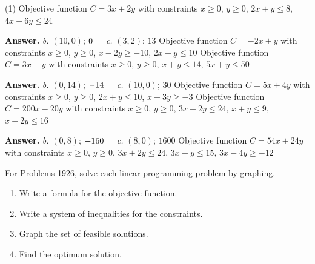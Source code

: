 \documentclass[10pt,]{book}
\theoremstyle{plain}
\theoremstyle{definition}
\theoremstyle{definition}
\theoremstyle{definition}
\numberwithin{equation}{part}
\begin{document}
\begin{exercisegroup}(1)
\exercise[13.]\hypertarget{exercise-17}{}Objective function \(C = 3x + 2y\) with constraints \(x\ge 0\), \(y\ge 0\), \(2x + y\le 8\), \(4x + 6y \le 24\)%
\par\smallskip
\noindent\textbf{Answer.}\hypertarget{answer-11}{}\quad
\emph{b.} \((10,0) \); \(0\hphantom{000}\)\emph{c.} \((3,2) \); \(13\)%
\exercise[14.]\hypertarget{exercise-18}{}Objective function \(C = −2x + y\) with constraints \(x\ge 0\), \(y\ge 0\), \(x-2y \ge -10\), \(2x+y\le 10\)%
\exercise[15.]\hypertarget{exercise-19}{}Objective function \(C = 3x − y\) with constraints \(x\ge 0\), \(y\ge 0\), \(x + y\le 14\), \(5x + y \le 50\)%
\par\smallskip
\noindent\textbf{Answer.}\hypertarget{answer-12}{}\quad
\emph{b.} \((0,14) \); \(-14\hphantom{000}\)\emph{c.} \((10,0) \); \(30\)%
\exercise[16.]\hypertarget{exercise-20}{}Objective function \(C = 5x + 4y\) with constraints \(x\ge 0\), \(y\ge 0\), \(2x+y \le 10\), \(x-3y\ge -3\)%
\exercise[17.]\hypertarget{exercise-21}{}Objective function \(C = 200x − 20y\) with constraints \(x\ge 0\), \(y\ge 0\), \(3x + 2y\le 24\), \(x + y \le 9\), \(x + 2y \le 16\)%
\par\smallskip
\noindent\textbf{Answer.}\hypertarget{answer-13}{}\quad
\emph{b.} \((0,8) \); \(-160\hphantom{000}\)\emph{c.} \((8,0) \); \(1600\)%
\exercise[18.]\hypertarget{exercise-22}{}Objective function \(C = 54x + 24y\) with constraints \(x\ge 0\), \(y\ge 0\), \(3x + 2y \le 24\), \(3x-y\le 15\), \(3x − 4y \ge −12\)%
\end{exercisegroup}
\par\smallskip\noindent
\hypertarget{exercisegroup-5}{}\par\noindent For Problems 19\textendash{}26, solve each linear programming problem by graphing. \leavevmode%
\begin{enumerate}[label=\alph*]
\item\hypertarget{li-69}{}Write a formula for the objective function.%
\item\hypertarget{li-70}{}Write a system of inequalities for the constraints.%
\item\hypertarget{li-71}{}Graph the set of feasible solutions.%
\item\hypertarget{li-72}{}Find the optimum solution.%
\end{enumerate}
%
\end{document}
